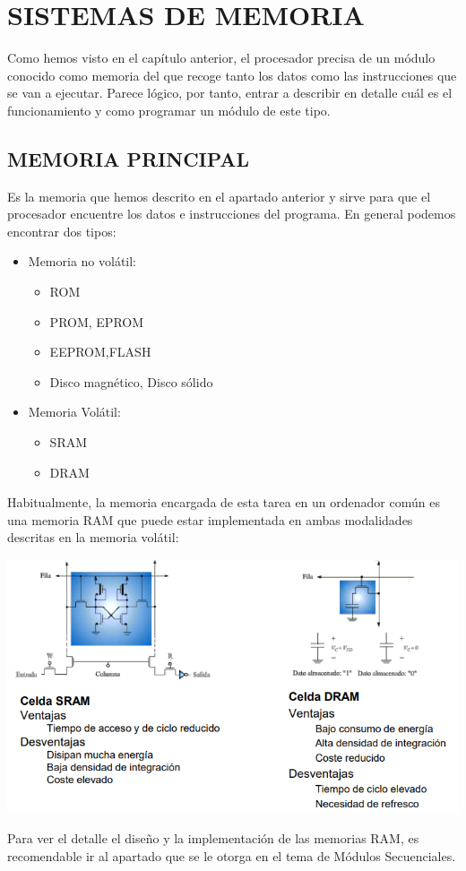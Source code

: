 \documentclass[a4paper,10pt]{book}
\begin{document}
\chapter*{SISTEMAS DE MEMORIA}
Como hemos visto en el capítulo anterior, el procesador precisa de un módulo conocido como memoria del que recoge tanto los datos como las instrucciones que se van a ejecutar. Parece lógico, por tanto, entrar a describir en detalle cuál es el funcionamiento y como programar un módulo de este tipo.
\section*{MEMORIA PRINCIPAL}
Es la memoria que hemos descrito en el apartado anterior y sirve para que el procesador encuentre los datos e instrucciones del programa. En general podemos encontrar dos tipos:
\begin{itemize}
\item Memoria no volátil:
	\begin{itemize}
	\item ROM
	\item PROM, EPROM
	\item EEPROM,FLASH
	\item Disco magnético, Disco sólido
	\end{itemize}
\item Memoria Volátil:
	\begin{itemize}
	\item SRAM
	\item DRAM
	\end{itemize}
\end{itemize}
Habitualmente, la memoria encargada de esta tarea en un ordenador común es una memoria RAM que puede estar implementada en ambas modalidades descritas en la memoria volátil:
\begin{center}
\includegraphics[scale=0.7]{modalidades RAM}
\end{center}
Para ver el detalle el diseño y la implementación de las memorias RAM, es recomendable ir al apartado que se le otorga en el tema de Módulos Secuenciales.
\end{document}
